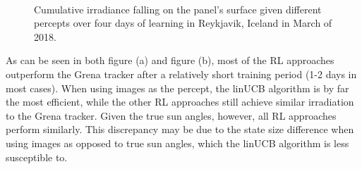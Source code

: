 \documentclass{article}
\begin{document}
{\begin{figure}
\begin{center}
	 \\ %
\caption{Cumulative irradiance falling on the panel's surface given different percepts over four days of learning in Reykjavik, Iceland in March of 2018.}
\label{fig:results_ice}
\end{center}
\end{figure}

As can be seen in both figure (a) and figure (b), most of the RL approaches outperform the Grena tracker after a relatively short training period (1-2 days in most cases). When using images as the percept, the linUCB algorithm is by far the most efficient, while the other RL approaches still achieve similar irradiation to the Grena tracker. Given the true sun angles, however,  all RL approaches perform similarly. This discrepancy may be due to the state size difference when using images as opposed to true sun angles, which the linUCB algorithm is less susceptible to.



}
\end{document}
